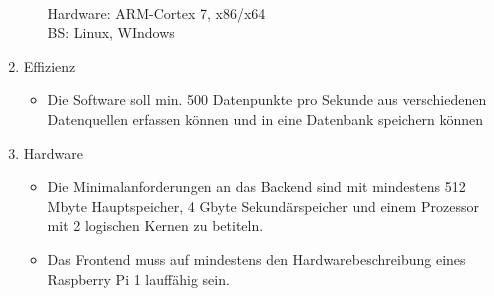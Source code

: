 \begin{enumerate}
\begin{itemize}
        \\Hardware: ARM-Cortex 7, x86/x64
          \\  BS: Linux, WIndows
    \end{itemize}
    \item Effizienz
    \begin{itemize}
        \item Die Software soll min. 500 Datenpunkte pro Sekunde aus verschiedenen Datenquellen erfassen können und in eine Datenbank speichern können 
    \end{itemize}
    \item Hardware
    \begin{itemize}
        \item Die Minimalanforderungen an das Backend sind mit mindestens 512 Mbyte Hauptspeicher, 4 Gbyte Sekundärspeicher und einem Prozessor mit 2 logischen Kernen zu betiteln.
        \item Das Frontend muss auf mindestens den Hardwarebeschreibung eines Raspberry Pi 1 lauffähig sein. 
    \end{itemize}
\end{enumerate}

